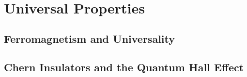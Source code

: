\section{Universal Properties}

\subsection{Ferromagnetism and Universality}
\subsection{Chern Insulators and the Quantum Hall Effect}